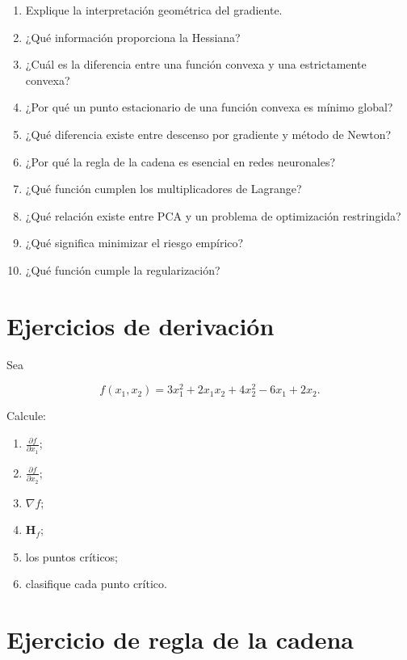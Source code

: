 \documentclass[
  spanish,
  10.5pt,
  letterpaper,
  DIV=11,
  numbers=noendperiod,
  oneside,
  open=any]{scrreprt}
\providecommand{\tightlist}{%
  \setlength{\itemsep}{0pt}\setlength{\parskip}{0pt}}
\theoremstyle{definition}
\theoremstyle{definition}
\theoremstyle{plain}
\theoremstyle{remark}
\begin{document}
\begin{enumerate}
\def\labelenumi{\arabic{enumi}.}
\tightlist
\item
  Explique la interpretación geométrica del gradiente.
\item
  ¿Qué información proporciona la Hessiana?
\item
  ¿Cuál es la diferencia entre una función convexa y una estrictamente
  convexa?
\item
  ¿Por qué un punto estacionario de una función convexa es mínimo
  global?
\item
  ¿Qué diferencia existe entre descenso por gradiente y método de
  Newton?
\item
  ¿Por qué la regla de la cadena es esencial en redes neuronales?
\item
  ¿Qué función cumplen los multiplicadores de Lagrange?
\item
  ¿Qué relación existe entre PCA y un problema de optimización
  restringida?
\item
  ¿Qué significa minimizar el riesgo empírico?
\item
  ¿Qué función cumple la regularización?
\end{enumerate}

\section*{Ejercicios de derivación}\label{ejercicios-de-derivaciuxf3n}


Sea

\[
f(x_1,x_2)
=
3x_1^2
+
2x_1x_2
+
4x_2^2
-
6x_1
+
2x_2.
\]

Calcule:

\begin{enumerate}
\def\labelenumi{\arabic{enumi}.}
\tightlist
\item
  \(\frac{\partial f}{\partial x_1}\);
\item
  \(\frac{\partial f}{\partial x_2}\);
\item
  \(\nabla f\);
\item
  \(\mathbf{H}_f\);
\item
  los puntos críticos;
\item
  clasifique cada punto crítico.
\end{enumerate}

\section*{Ejercicio de regla de la
cadena}\label{ejercicio-de-regla-de-la-cadena}
\end{document}
